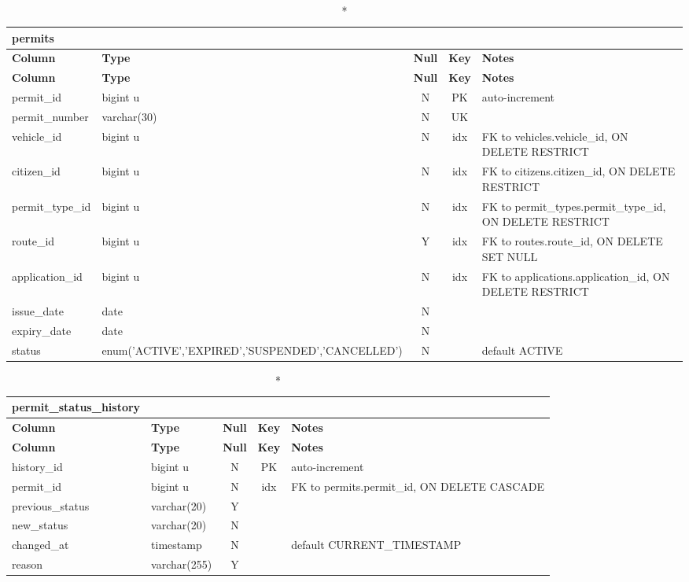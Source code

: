\begin{longtable}{@{}p{3.4cm}p{2.9cm}c c p{5.6cm}@{}}
\caption*{\textbf{permits}}\\
\toprule \textbf{Column} & \textbf{Type} & \textbf{Null} & \textbf{Key} & \textbf{Notes} \\ \midrule \endfirsthead
\toprule \textbf{Column} & \textbf{Type} & \textbf{Null} & \textbf{Key} & \textbf{Notes} \\ \midrule \endhead
\bottomrule \endlastfoot
permit\_\allowbreak{}id & bigint u & N & PK & auto-increment \\
permit\_\allowbreak{}number & varchar(30) & N & UK &  \\
vehicle\_\allowbreak{}id & bigint u & N & idx & FK to vehicles.vehicle\_\allowbreak{}id, ON DELETE RESTRICT \\
citizen\_\allowbreak{}id & bigint u & N & idx & FK to citizens.citizen\_\allowbreak{}id, ON DELETE RESTRICT \\
permit\_\allowbreak{}type\_\allowbreak{}id & bigint u & N & idx & FK to permit\_\allowbreak{}types.permit\_\allowbreak{}type\_\allowbreak{}id, ON DELETE RESTRICT \\
route\_\allowbreak{}id & bigint u & Y & idx & FK to routes.route\_\allowbreak{}id, ON DELETE SET NULL \\
application\_\allowbreak{}id & bigint u & N & idx & FK to applications.application\_\allowbreak{}id, ON DELETE RESTRICT \\
issue\_\allowbreak{}date & date & N &  &  \\
expiry\_\allowbreak{}date & date & N &  &  \\
status & enum('ACTIVE',\allowbreak{}'EXPIRED',\allowbreak{}'SUSPENDED',\allowbreak{}'CANCELLED') & N &  & default ACTIVE \\
\end{longtable}
\vspace{-0.4em}
\begin{longtable}{@{}p{3.4cm}p{2.9cm}c c p{5.6cm}@{}}
\caption*{\textbf{permit\_\allowbreak{}status\_\allowbreak{}history}}\\
\toprule \textbf{Column} & \textbf{Type} & \textbf{Null} & \textbf{Key} & \textbf{Notes} \\ \midrule \endfirsthead
\toprule \textbf{Column} & \textbf{Type} & \textbf{Null} & \textbf{Key} & \textbf{Notes} \\ \midrule \endhead
\bottomrule \endlastfoot
history\_\allowbreak{}id & bigint u & N & PK & auto-increment \\
permit\_\allowbreak{}id & bigint u & N & idx & FK to permits.permit\_\allowbreak{}id, ON DELETE CASCADE \\
previous\_\allowbreak{}status & varchar(20) & Y &  &  \\
new\_\allowbreak{}status & varchar(20) & N &  &  \\
changed\_\allowbreak{}at & timestamp & N &  & default CURRENT\_\allowbreak{}TIMESTAMP \\
reason & varchar(255) & Y &  &  \\
\end{longtable}
\vspace{-0.4em}
